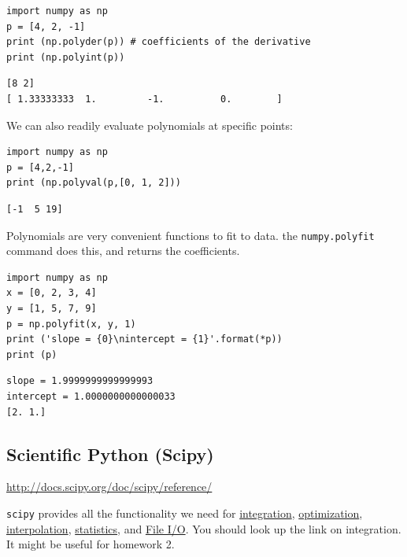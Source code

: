 \documentclass[11pt]{article}
\begin{document}
\begin{verbatim}
import numpy as np
p = [4, 2, -1]
print (np.polyder(p)) # coefficients of the derivative
print (np.polyint(p))
\end{verbatim}

\begin{verbatim}
[8 2]
[ 1.33333333  1.         -1.          0.        ]
\end{verbatim}

We can also readily evaluate polynomials at specific points:
\begin{verbatim}
import numpy as np
p = [4,2,-1]
print (np.polyval(p,[0, 1, 2]))
\end{verbatim}

\begin{verbatim}
[-1  5 19]
\end{verbatim}

Polynomials are very convenient functions to fit to data. the \texttt{numpy.polyfit} command does this, and returns the coefficients.

\begin{verbatim}
import numpy as np
x = [0, 2, 3, 4]
y = [1, 5, 7, 9]
p = np.polyfit(x, y, 1)
print ('slope = {0}\nintercept = {1}'.format(*p))
print (p)
\end{verbatim}

\begin{verbatim}
slope = 1.9999999999999993
intercept = 1.0000000000000033
[2. 1.]
\end{verbatim}


\subsection{Scientific Python (Scipy)}
\label{sec:org996947e}
\url{http://docs.scipy.org/doc/scipy/reference/}

\texttt{scipy} provides all the functionality we need for \href{http://docs.scipy.org/doc/scipy/reference/tutorial/integrate.html}{integration}, \href{http://docs.scipy.org/doc/scipy/reference/tutorial/optimize.html}{optimization}, \href{http://docs.scipy.org/doc/scipy/reference/tutorial/interpolate.html}{interpolation}, \href{http://docs.scipy.org/doc/scipy/reference/tutorial/stats.html}{statistics}, and \href{http://docs.scipy.org/doc/scipy/reference/tutorial/io.html}{File I/O}. You should look up the link on integration. It might be useful for homework 2.
\end{document}
